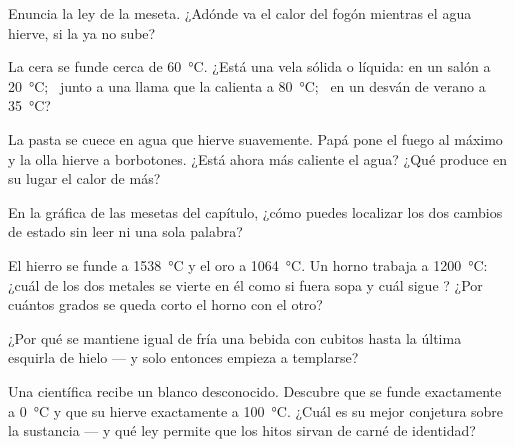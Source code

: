 \begin{exercise}[$\star$]\label{exo:g4:changes-of-state:4}
Enuncia la ley de la meseta. ¿Adónde va el calor del fogón mientras el
agua hierve, si la  ya no sube?
\end{exercise}

\begin{exercise}[$\star$]\label{exo:g4:changes-of-state:5}
La cera se funde cerca de \qty{60}{\celsius}. ¿Está una vela
sólida o líquida: en un salón a \qty{20}{\celsius}; \ junto a una
llama que la calienta a \qty{80}{\celsius}; \ en un desván de verano a
\qty{35}{\celsius}?
\end{exercise}

\begin{exercise}[$\star$]\label{exo:g4:changes-of-state:6}
La pasta se cuece en agua que hierve suavemente. Papá pone el fuego al
máximo y la olla hierve a borbotones. ¿Está ahora más caliente el
agua? ¿Qué produce en su lugar el calor de más?
\end{exercise}

\begin{exercise}[$\star$]\label{exo:g4:changes-of-state:7}
En la gráfica de las mesetas del capítulo, ¿cómo puedes localizar los
dos cambios de estado sin leer ni una sola palabra?
\end{exercise}

\begin{exercise}[$\star$]\label{exo:g4:changes-of-state:8}
El hierro se funde a \qty{1538}{\celsius} y el oro a
\qty{1064}{\celsius}. Un horno trabaja a \qty{1200}{\celsius}: ¿cuál
de los dos metales se vierte en él como si fuera sopa y cuál sigue
? ¿Por cuántos grados se queda corto el horno con el otro?
\end{exercise}

\begin{exercise}[$\star$]\label{exo:g4:changes-of-state:9}
¿Por qué se mantiene igual de fría una bebida con cubitos hasta la
última esquirla de hielo --- y solo entonces empieza a templarse?
\end{exercise}

\begin{exercise}[$\star\star$]\label{exo:g4:changes-of-state:10}
Una científica recibe un  blanco desconocido. Descubre que
se funde exactamente a \qty{0}{\celsius} y que su  hierve
exactamente a \qty{100}{\celsius}. ¿Cuál es su mejor conjetura sobre
la sustancia --- y qué ley permite que los hitos sirvan de carné de
identidad?
\end{exercise}

